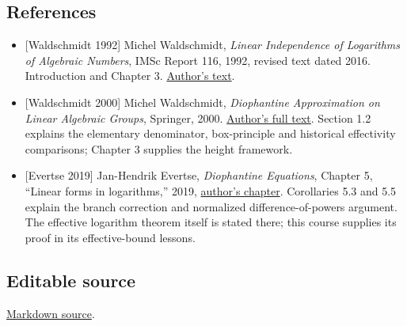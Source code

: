 \documentclass[
  11pt,
  a4paper,
]{article}
\providecommand{\tightlist}{%
  \setlength{\itemsep}{0pt}\setlength{\parskip}{0pt}}
\begin{document}
\subsection{References}\label{references}

\begin{itemize}
\tightlist
\item
  {[}Waldschmidt 1992{]} Michel Waldschmidt, \emph{Linear Independence
  of Logarithms of Algebraic Numbers}, IMSc Report 116, 1992, revised
  text dated 2016. Introduction and Chapter 3.
  \href{https://webusers.imj-prg.fr/~michel.waldschmidt/articles/pdf/LIL.pdf}{Author's
  text}.
\item
  {[}Waldschmidt 2000{]} Michel Waldschmidt, \emph{Diophantine
  Approximation on Linear Algebraic Groups}, Springer, 2000.
  \href{https://webusers.imj-prg.fr/~michel.waldschmidt/articles/pdf/dalag.pdf}{Author's
  full text}. Section 1.2 explains the elementary denominator,
  box-principle and historical effectivity comparisons; Chapter 3
  supplies the height framework.
\item
  {[}Evertse 2019{]} Jan-Hendrik Evertse, \emph{Diophantine Equations},
  Chapter 5, ``Linear forms in logarithms,'' 2019,
  \href{https://pub.math.leidenuniv.nl/~evertsejh/dio19-5.pdf}{author's
  chapter}. Corollaries 5.3 and 5.5 explain the branch correction and
  normalized difference-of-powers argument. The effective logarithm
  theorem itself is stated there; this course supplies its proof in its
  effective-bound lessons.
\end{itemize}

\subsection{Editable source}\label{editable-source}

\href{https://kokunoyumeto.github.io/open-math-courses-public/courses/TR-BAKER/src/TR-BAKER-01.md}{Markdown source}.
\end{document}
